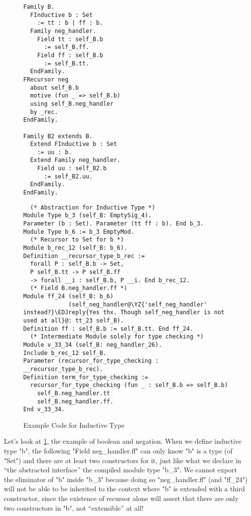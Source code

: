 \begin{figure}[!htb]
  \begin{minipage}[t]{0.3\linewidth}
\begin{verbatim}
Family B.
  FInductive b : Set 
    := tt : b | ff : b.
  Family neg_handler. 
    Field tt : self_B.b 
      := self_B.ff.
    Field ff : self_B.b 
      := self_B.tt.
  EndFamily.
FRecursor neg 
  about self_B.b 
  motive (fun _ => self_B.b)
  using self_B.neg_handler
  by _rec.
EndFamily.

Family B2 extends B.
  Extend FInductive b : Set 
    := uu : b.
  Extend Family neg_handler.
    Field uu : self_B2.b 
      := self_B2.uu.
  EndFamily. 
EndFamily.
\end{verbatim}
  \end{minipage}
  \begin{minipage}[t]{0.65\linewidth}
\begin{verbatim}
  (* Abstraction for Inductive Type *)
Module Type b_3 (self_B: EmptySig_4).
Parameter (b : Set). Parameter (tt ff : b). End b_3.      
Module Type b_6 := b_3 EmptyMod.
  (* Recursor to Set for b *)
Module b_rec_12 (self_B: b_6).
Definition __recursor_type_b_rec :=
  forall P : self_B.b -> Set,
  P self_B.tt -> P self_B.ff 
  -> forall __i : self_B.b, P __i. End b_rec_12. 
  (* Field B.neg_handler.ff *)
Module ff_24 (self_B: b_6) 
             (self_neg_handler@\YZ{'self_neg_handler' instead?}\EDJreply{Yes thx. Though self_neg_handler is not used at all}@: tt_23 self_B).
Definition ff : self_B.b := self_B.tt. End ff_24.
  (* Intermediate Module solely for type checking *)
Module v_33_34 (self_B: neg_handler_26).
Include b_rec_12 self_B.
Parameter (recursor_for_type_checking : __recursor_type_b_rec).
Definition term_for_type_checking :=
  recursor_for_type_checking (fun _ : self_B.b => self_B.b)
    self_B.neg_handler.tt
    self_B.neg_handler.ff.  
End v_33_34.
\end{verbatim}
  \end{minipage}
\caption{Example Code for Inductive Type}\label{fig:plugin-example2}
\end{figure}

Let's look at \cref{fig:plugin-example2}, the example of boolean and
negation. When we define inductive type "b", the following "Field
neg_handler.ff" can only know "b" is a type (of "Set") and there are at
least two constructors for it, just like what we declare in ``the
abstracted interface'' the compiled module type "b_3". We cannot export
the eliminator of "b" inside "b_3" because doing so "neg_handler.ff"
(and "ff_24") will not be able to be inherited to the context where "b"
is extended with a third constructor, since the existence of recursor
alone will assert that there are only two constructors in "b", not
``extensible'' at all!

